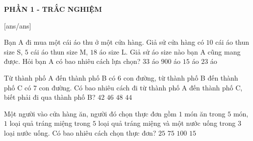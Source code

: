 
\begin{center}
	\textbf{PHẦN 1 - TRẮC NGHIỆM}
\end{center}
[ans/ans]
\begin{ex}%
Bạn A đi mua một cái áo thu ở một cửa hàng. Giả sử cửa hàng có $10$ cái áo thun size S, $5$ cái áo thun size M, $18$ áo size L. Giả sử áo size nào bạn A cũng mang được. Hỏi bạn A có bao nhiêu cách lựa chọn?
	\choice
	{\True $33$ áo}
	{$900$ áo}
	{$15$ áo}
	{$23$ áo}
\end{ex}
\begin{ex}%
	Từ thành phố A đến thành phố B có $6$ con đường, từ thành phố B đến thành phố C có $7$ con đường. Có bao nhiêu cách đi từ thành phố A đến thành phố C, biết phải đi qua thành phố B?
	\choice
	{\True $42$}
	{$46$}
	{$48$}
	{$44$}
\end{ex}
\begin{ex}%
	Một người vào cửa hàng ăn, người đó chọn thực đơn gồm $1$ món ăn trong $5$ món, $1$ loại quả tráng miệng trong $5$ loại quả tráng miệng và một nước uống trong $3$ loại nước uống. Có bao nhiêu cách chọn thực đơn?
	\choice
	{$25$}
	{\True $75$}
	{$100$}
	{$15$}
\end{ex}

